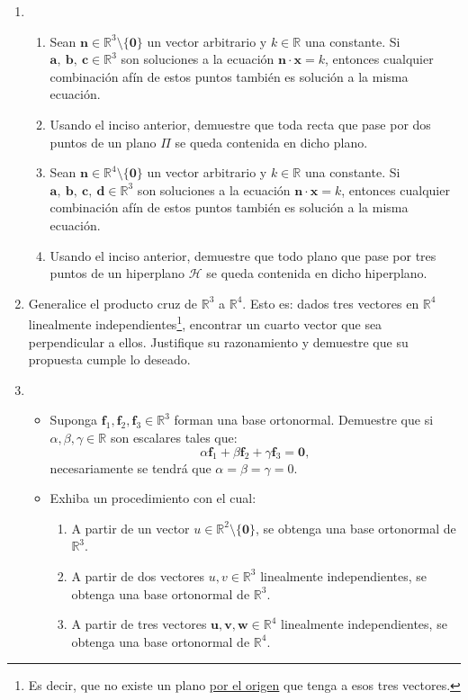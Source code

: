 \documentclass[a4paper, 12pt]{article}
\begin{document}
\begin{enumerate}
\item 
\begin{enumerate}
  \item Sean $\mathbf{n} \in \mathbb{R}^3 \setminus \{\mathbf{0}\}$ un vector arbitrario y $k \in \mathbb{R}$ una constante. Si $\mathbf{a},\ \mathbf{b},\ \mathbf{c} \in \mathbb{R}^3$ son soluciones a la ecuación $\mathbf{n} \cdot \mathbf{x} = k$, entonces cualquier combinación afín de estos puntos también es solución a la misma ecuación. 
  \item Usando el inciso anterior, demuestre que toda recta que pase por dos puntos de un plano $\Pi$ se queda contenida en dicho plano. 
  \item Sean $\mathbf{n} \in \mathbb{R}^4 \setminus \{\mathbf{0}\}$ un vector arbitrario y $k \in \mathbb{R}$ una constante. Si $\mathbf{a},\ \mathbf{b},\ \mathbf{c},\ \mathbf{d}\in \mathbb{R}^3$ son soluciones a la ecuación $\mathbf{n} \cdot \mathbf{x} = k$, entonces cualquier combinación afín de estos puntos también es solución a la misma ecuación. 
  \item Usando el inciso anterior, demuestre que todo plano que pase por tres puntos de un hiperplano $\mathcal{H}$ se queda contenida en dicho hiperplano. 
\end{enumerate} 

\item Generalice el producto cruz de $\mathbb{R}^3$ a $\mathbb{R}^4$. Esto es: dados tres vectores en $\mathbb{R}^4$ linealmente independientes\footnote{Es decir, que no existe un plano \underline{por el origen} que tenga a esos tres vectores.}, encontrar un cuarto vector que sea perpendicular a ellos. Justifique su razonamiento y demuestre que su propuesta cumple lo deseado.

\item 
\begin{itemize}
    \item Suponga $\mathbf{f}_{1}, \mathbf{f}_{2}, \mathbf{f}_{3} \in \mathbb{R}^3$ forman una base ortonormal. Demuestre que si $\alpha, \beta, \gamma \in \mathbb{R}$ son escalares tales que: 
\[
    \alpha \mathbf{f}_{1} + \beta \mathbf{f}_{2} + \gamma \mathbf{f}_{3} = \mathbf{0},
\]
    necesariamente se tendrá que $\alpha = \beta = \gamma = 0$. 
    \item Exhiba un procedimiento con el cual:
    \begin{enumerate}
        \item A partir de un vector $u \in \mathbb{R}^2\setminus \{\mathbf{0}\}$, se obtenga una base ortonormal de $\mathbb{R}^3$. 
        \item A partir de dos vectores $u, v \in \mathbb{R}^3$ linealmente independientes, se obtenga una base ortonormal de $\mathbb{R}^3$. 
        \item A partir de tres vectores $\mathbf{u}, \mathbf{v}, \mathbf{w} \in \mathbb{R}^4$ linealmente independientes, se obtenga una base ortonormal de $\mathbb{R}^4$. 
    \end{enumerate} 
\end{itemize} 


\end{enumerate}
\end{document}
